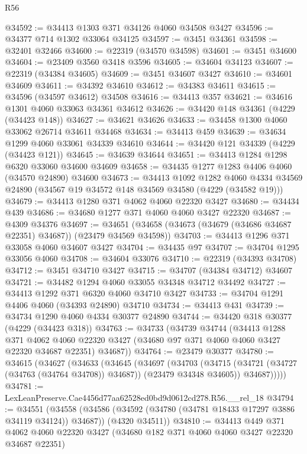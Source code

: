 \begin{lexlean}{R56}
\begin{coremodule}
@34592 := @34413 @1303 @371 @34126 @4060 @34508 @3427
@34596 := @34377 @714 @1302 @33064 @34125
@34597 := @3451 @34361
@34598 := @32401 @32466
@34600 := @22319 (@34570 @34598)
@34601 := @3451 @34600
@34604 := @23409 @3560 @3418 @3596
@34605 := @34604 @34123
@34607 := @22319 (@34384 @34605)
@34609 := @3451 @34607 @3427
@34610 := @34601 @34609
@34611 := @34392 @34610
@34612 := @34383 @34611
@34615 := @34596 (@34597 @34612) @34508
@34616 := @34413 @357
@34621 := @34616 @1301 @4060 @33063 @34361 @34612
@34626 := @34420 @148 @34361 (@4229 (@34423 @148))
@34627 := @34621 @34626
@34633 := @34458 @1300 @4060 @33062 @26714 @34611 @34468
@34634 := @34413 @459
@34639 := @34634 @1299 @4060 @33061 @34339 @34610
@34644 := @34420 @121 @34339 (@4229 (@34423 @121))
@34645 := @34639 @34644
@34651 := @34413 @1284 @1298 @6320 @33060 @34600 @34609
@34658 := @34435 @1277 @1283 @4406 @4060 (@34570 @24890) @34600
@34673 := @34413
    @1092
    @1282
    @4060
    @4334
    @34569
    @24890
    (@34567 @19 @34572 @148 @34569 @34580 (@4229 (@34582 @19)))
@34679 := @34413 @1280 @371 @4062 @4060 @22320 @3427
@34680 := @34434 @439
@34686 := @34680 @1277 @371 @4060 @4060 @3427 @22320
@34687 := @4309 @34376
@34697 := @34651 (@34658 (@34673 (@34679 (@34686 @34687 @22351) @34687)) (@23479 @34569 @34598))
@34703 := @34413 @1296 @371 @33058 @4060 @34607 @3427
@34704 := @34435 @97
@34707 := @34704 @1295 @33056 @4060
@34708 := @34604 @33076
@34710 := @22319 (@34393 @34708)
@34712 := @3451 @34710 @3427
@34715 := @34707 (@34384 @34712) @34607
@34721 := @34482 @1294 @4060 @33055 @34348 @34712 @34492
@34727 := @34413 @1292 @371 @6320 @4060 @34710 @3427
@34733 := @34704 @1291 @4406 @4060 (@34393 @24890) @34710
@34734 := @34413 @431
@34739 := @34734 @1290 @4060 @4334 @30377 @24890
@34744 := @34420 @318 @30377 (@4229 (@34423 @318))
@34763 := @34733
    (@34739
      @34744
      (@34413
        @1288
        @371
        @4062
        @4060
        @22320
        @3427
        (@34680 @97 @371 @4060 @4060 @3427 @22320 @34687 @22351)
        @34687))
@34764 := @23479 @30377
@34780 := @34615
    (@34627
      (@34633
        (@34645
          (@34697
            (@34703
              (@34715 (@34721 (@34727 (@34763 (@34764 @34708)) @34687)) (@23479 @34348 @34605))
              @34687)))))
@34781 := LexLeanPreserve.Cae4456d77aa62528ed0bd9d0612cd278.R56.__rel_18
@34794 := @34551
    (@34558
      (@34586 (@34592 (@34780 (@34781 @18433 @17297 @3886 @34119 @34124)) @34687))
      (@4320 @34511))
@34810 := @34413
    @449
    @371
    @4062
    @4060
    @22320
    @3427
    (@34680 @182 @371 @4060 @4060 @3427 @22320 @34687 @22351)

\end{coremodule}
\end{lexlean}
